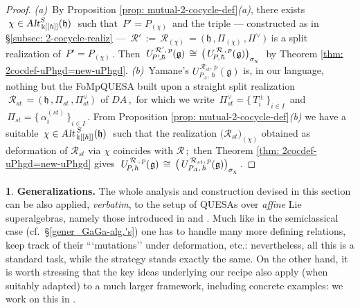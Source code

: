\documentclass[12pt,reqno,twoside,a4paper]{amsart}
\numberwithin{equation}{section}
\theoremstyle{definition}
\newtheorem{free text}[lema]{}
\theoremstyle{remark}
\newcommand{\R}{{\mathcal R}}
\def \kh{{\Bbbk[[\hbar]]}}
\def \lieg{\mathfrak{g}}
\def \lieh{\mathfrak{h}}
\def \uRpPhg{U^{\,\R\,,\,p}_{\!P,\hskip0,7pt\hbar}(\hskip0,5pt\lieg)}
\def \pf{\begin{proof}}
\def \epf{\end{proof}}
\theoremstyle{plain}
\begin{document}
\pf
%
   \textit{(a)}\,  By  Proposition \ref{prop: mutual-2-cocycle-def}\textit{(a)},  there exists
   $ \; \chi \in \text{\sl Alt}^S_{\,\kh}( \lieh ) \; $  such that
   $ \, P' = P_{(\chi)} \, $  and the triple   --- constructed as in  \S \ref{subsec: 2-cocycle-realiz}  ---
%
 $ \, \R' \, := \, \R_{(\chi)} \, = \, \big(\, \lieh \, , \Pi_{(\chi)} \, , \Pi^\vee \,\big) \, $
%
 is a split realization of  $ \, P' = P_{(\chi)} \, $.  Then  $ \; U_{\!P'\!,\hbar}^{\,\R',\,p}(\lieg) \, \cong \, {\big(\, \uRpPhg \big)}_{\sigma_\chi} \; $
 by  Theorem \ref{thm: 2cocdef-uPhgd=new-uPhgd}.
%
 \vskip5pt
%
   \textit{(b)}\,  Yamane's  $ U_{P_A,\,\hbar}^{\,\R_{st},\,p}(\lieg) $  is, in our language, nothing but the FoMpQUESA built upon a straight split realization  $ \; \R_{st} \,= \, \big(\, \lieh \, , \Pi_{st} \, , \Pi_{st}^\vee \,\big) \; $  of  $ DA \, $,  \,for which we write  $ \, \Pi_{st}^\vee = {\big\{\, T_i^\pm \,\big\}}_{i \in I} \, $  and  $ \, \Pi_{st} = {\big\{\, \alpha_i^{(st)} \,\big\}}_{i \in I} \, $.  From  Proposition \ref{prop: mutual-2-cocycle-def}\textit{(b)\/}  we have a suitable  $ \, \chi \in  \text{\sl Alt}_{\,\kh}^{\,S}(\lieh) \; $  such that the realization  $ \big(\R_{st}\big)_{(\chi)} $  obtained as deformation of  $ \R_{st} $  via  $ \chi $  coincides with  $ \R \, $;  \,then  Theorem \ref{thm: 2cocdef-uPhgd=new-uPhgd}  gives  $ \; \uRpPhg \, \cong \, {\big(\, U_{P_A,\,\hbar}^{\,\R_{st},\,p}(\lieg) \big)}_{\sigma_\chi} \, $.
%
\epf

\vskip3pt

\begin{free text}  \label{gener_quantum-GaGa-alg.'s}
%
 \textbf{Generalizations.}  The whole analysis and construction devised in this section can be also applied,  \textit{verbatim},  to the setup of QUESAs over  \textsl{affine\/}  Lie superalgebras, namely those introduced in \cite{Ya2}  and  \cite{Ya3}.  Much like in the semiclassical case  (cf.\ \S \ref{gener_GaGa-alg.'s})  one has to handle many more defining relations, keep track of their ```mutations'' under deformation, etc.: nevertheless, all this is a standard task, while the strategy stands exactly the same.  On the other hand, it is worth stressing that the key ideas underlying our recipe also apply (when suitably adapted) to a much larger framework, including concrete examples: we work on this in  \cite{GG6}.
%
\end{free text}

\bigskip
 \medskip
\end{document}
